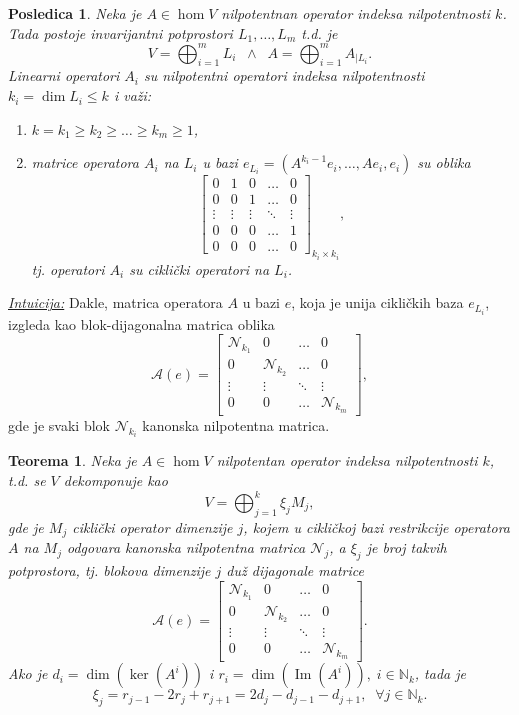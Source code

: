 \documentclass[a4paper,12pt,twoside]{report}
\newtheorem{theorem}{Teorema}[section]
\newtheorem{corollary}{Posledica}[theorem]
\numberwithin{algorithm}{section}
\begin{document}
\begin{corollary}
    Neka je $A \in \hom V$ nilpotentnan operator indeksa nilpotentnosti $k$. Tada postoje invarijantni potprostori 
    $L_1, \dots, L_m$ t.d. je
    \[ V = \bigoplus^{m}_{i=1} L_i \;\;\land\;\; A = \bigoplus^{m}_{i=1} A_{|L_i}.\]
    Linearni operatori $A_i$ su nilpotentni operatori indeksa nilpotentnosti $k_i = \dim L_i \leq k$ i važi:
    \begin{enumerate}
        \item $k = k_1 \geq k_2 \geq \dots \geq k_m \geq 1$,
        \item matrice operatora $A_i$ na $L_i$ u bazi $e_{L_i} = (A^{k_i-1}e_i, \dots, Ae_i, e_i)$ su oblika
        \[\begin{bmatrix}
        0 & 1 & 0 & \dots & 0 \\
        0 & 0 & 1 & \dots & 0 \\
        \vdots & \vdots & \vdots & \ddots & \vdots \\
        0 & 0 & 0 & \dots & 1 \\
        0 & 0 & 0 & \dots & 0
    \end{bmatrix}_{k_i \times k_i}, \] tj. operatori $A_i$ su ciklički operatori na $L_i$.
    \end{enumerate}
\end{corollary}
\noindent\underline{\textit{Intuicija:}} Dakle, matrica operatora $A$ u bazi $e$, koja je unija cikličkih baza $e_{L_i}$, 
izgleda kao blok-dijagonalna matrica oblika 
\[\mathcal{A}(e) = \begin{bmatrix}
    \mathcal{N}_{k_1} & 0 & \dots & 0 \\
    0 & \mathcal{N}_{k_2} & \dots & 0 \\
    \vdots & \vdots & \ddots & \vdots \\
    0 & 0 & \dots & \mathcal{N}_{k_m}
\end{bmatrix},\] gde je svaki blok $\mathcal{N}_{k_i}$ kanonska nilpotentna matrica.

\begin{theorem}
    Neka je $A \in \hom V$ nilpotentan operator indeksa nilpotentnosti $k$, t.d. se $V$ dekomponuje kao
    \[ V = \bigoplus_{j = 1}^{k}\xi_jM_j, \] gde je $M_j$ ciklički operator dimenzije $j$, kojem u cikličkoj bazi restrikcije operatora $A$ na $M_j$
    odgovara kanonska nilpotentna matrica $\mathcal{N}_j$, a $\xi_j$ je broj takvih potprostora, tj. blokova dimenzije $j$ duž dijagonale matrice
    \[\mathcal{A}(e) = \begin{bmatrix}
    \mathcal{N}_{k_1} & 0 & \dots & 0 \\
    0 & \mathcal{N}_{k_2} & \dots & 0 \\
    \vdots & \vdots & \ddots & \vdots \\
    0 & 0 & \dots & \mathcal{N}_{k_m}
\end{bmatrix}.\] Ako je $d_i = \dim(\ker(A^i))$ i $r_i = \dim(\operatorname{Im}(A^i)), \; i \in \mathbb{N}_k$, tada je
\[ \xi_j = r_{j-1} - 2r_j + r_{j+1} = 2d_j - d_{j-1} - d_{j+1}, \;\; \forall j \in \mathbb{N}_k. \]
\end{theorem}
\end{document}
